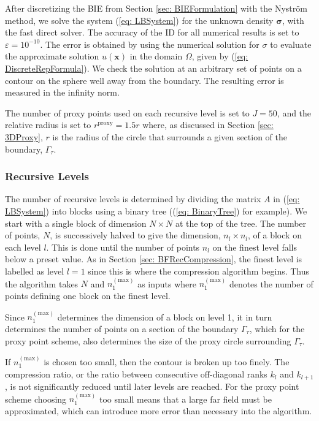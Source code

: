 \documentclass{sfuthesis}
\begin{document}
After discretizing the BIE from Section \ref{sec: BIEFormulation} with the Nystr\"{o}m method, we solve the system (\ref{eq: LBSystem}) for the unknown density $\bm{\sigma}$, with the fast direct solver. The accuracy of the ID  for all numerical results is set to $\varepsilon=10^{-10}$. 
The error is obtained by using the numerical solution for $\sigma$ to evaluate the approximate solution $u(\mathbf{x})$ in the domain $\Omega$, given by (\ref{eq: DiscreteRepFormula}). We check the solution at an arbitrary set of points on a contour on the sphere well away from the boundary. The resulting error is measured in the infinity norm. 

The number of proxy points used on each recursive level is set to $J=50$, and the relative radius is set to $r^{\text{proxy}}=1.5r$ where, as discussed in Section \ref{sec: 3DProxy}, $r$ is the radius of the circle that surrounds a given section of the boundary, $\Gamma_\tau$. 

\subsubsection{Recursive Levels}

The number of recursive levels is determined by dividing the matrix $A$ in (\ref{eq: LBSystem}) into blocks using a binary tree ((\ref{eq: BinaryTree}) for example). We start with a single block of dimension $N \times N$ at the top of the tree. The number of points, $N$, is successively halved to give the dimension, $n_l \times n_l$, of a block on each level $l$. This is done until the number of points $n_l$ on the finest level falls below a preset value. As in Section \ref{sec: BFRecCompression}, the finest level is labelled as level $l=1$ since this is where the compression algorithm begins. Thus the algorithm takes $N$ and $n_1^{(\text{max})}$ as inputs where $n_1^{(\text{max})}$ denotes the number of points defining one block on the finest level. 

Since $n_1^{(\text{max})}$ determines the dimension of a block on level 1, it in turn determines the number of points on a section of the boundary $\Gamma_\tau$, which for the proxy point scheme, also determines the size of the proxy circle surrounding $\Gamma_\tau$. 

If $n_1^{(\text{max})}$  is chosen too small, then the contour is broken up too finely. The compression ratio, or the ratio between consecutive off-diagonal ranks $k_l$ and $k_{l+1}$, is not significantly reduced until later levels are reached. For the proxy point scheme choosing $n_1^{(\text{max})}$ too small means that a large far field must be approximated, which can introduce more error than necessary into the algorithm.   
\end{document}
